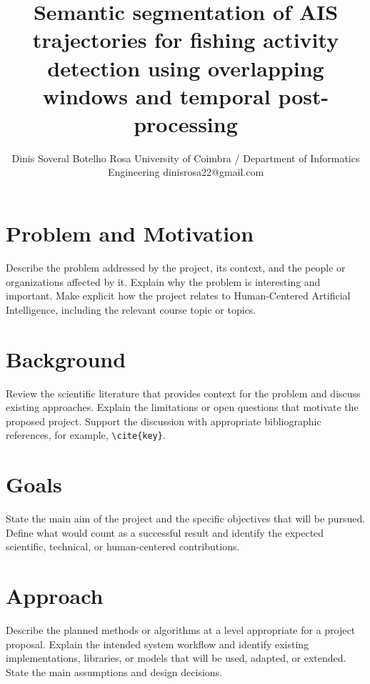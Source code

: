 \documentclass{article}
\title{Semantic segmentation of AIS trajectories for fishing activity detection using overlapping windows and temporal post-processing}
\author{
    Dinis Soveral Botelho Rosa
    \affiliations
    University of Coimbra / Department of Informatics Engineering
    \emails
    dinisrosa22@gmail.com
}
\begin{document}
\maketitle


\section{Problem and Motivation}
\label{sec:problem-motivation}

Describe the problem addressed by the project, its context, and the people or
organizations affected by it. Explain why the problem is interesting and
important. Make explicit how the project relates to Human-Centered Artificial
Intelligence, including the relevant course topic or topics.

\section{Background}
\label{sec:background}

Review the scientific literature that provides context for the problem and
discuss existing approaches. Explain the limitations or open questions that
motivate the proposed project. Support the discussion with appropriate
bibliographic references, for example, \verb|\cite{key}|.

\section{Goals}
\label{sec:goals}

State the main aim of the project and the specific objectives that will be
pursued. Define what would count as a successful result and identify the
expected scientific, technical, or human-centered contributions.

\section{Approach}
\label{sec:approach}

Describe the planned methods or algorithms at a level appropriate for a
project proposal. Explain the intended system workflow and identify existing
implementations, libraries, or models that will be used, adapted, or
extended. State the main assumptions and design decisions.
\end{document}
